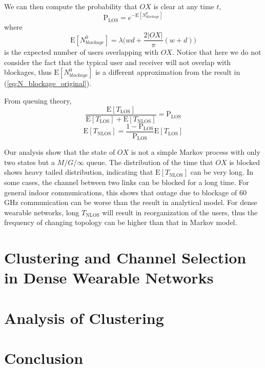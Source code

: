 \documentclass[10pt, conference, letterpaper]{IEEEtran}
\begin{document}
We can then compute the probability that $OX$ is clear at any time $t$, 
\begin{equation}
\mathrm{P}_{\mathrm{LOS}} = e^{-\mathrm{E}[N_{blockage}^0]}
\end{equation}
where 
\begin{equation*}
\mathrm{E}[N_{blockage}^0] = \lambda\big(wd+\frac{2|OX|}{\pi}(w+d)\big)
\end{equation*} 
is the expected number of users overlapping with $OX$. Notice that here we do not consider the fact that the typical user and receiver will not overlap with blockages, thus $\mathrm{E}[N_{blockage}^0]$ is a different approximation from the result in (\ref{eq:N_blockage_original}).

From queuing theory, 
\begin{equation}
\frac{\mathrm{E}[T_{\mathrm{LOS}}]}{\mathrm{E}[T_{\mathrm{LOS}}] + \mathrm{E}[T_{\mathrm{NLOS}}]} = \mathrm{P}_{\mathrm{LOS}}
\end{equation}
\begin{equation}
\mathrm{E}[T_{\mathrm{NLOS}}] = \frac{1-\mathrm{P}_{\mathrm{LOS}}}{ \mathrm{P}_{\mathrm{LOS}}}\mathrm{E}[T_{\mathrm{LOS}}]
\end{equation}

Our analysis show that the state of $OX$ is not a simple Markov process with only two states but a $M/G/\infty$ queue. The distribution of the time that $OX$ is blocked shows heavy tailed distribution, indicating that $\mathrm{E}[T_{\mathrm{NLOS}}]$ can be very long. In some cases, the channel between two links can be blocked for a long time. For general indoor communications, this shows that outage due to blockage of 60 GHz communication can be worse than the result in analytical model. For dense wearable networks, long $T_{\mathrm{NLOS}}$ will result in reorganization of the users, thus the frequency of changing topology can be higher than that in Markov model.

\section{Clustering and Channel Selection in Dense Wearable Networks}\label{section:MAC}
\section{Analysis of Clustering}\label{section:clusteranalysis}
\section{Conclusion}\label{section:conclusion}
\end{document}

